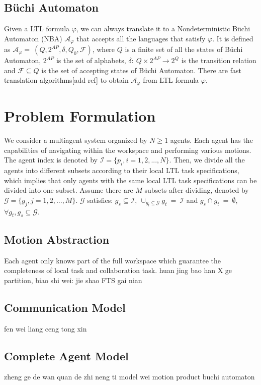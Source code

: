\documentclass[journal]{IEEEtran}
\begin{document}
\subsection{B\"{u}chi Automaton}
Given a LTL formula $\varphi$, we can always translate it to a Nondeterministic B\"{u}chi Automaton (NBA) $\mathcal{A}_\varphi$ that accepts all the languages that satisfy $\varphi$. It is defined as $\mathcal{A}_\varphi=\ (Q,2^{AP},\delta,Q_0,\mathcal{F})$, where $Q$ is a finite set of all the states of B\"{u}chi Automaton, $2^{AP}$ is the set of alphabets, $\delta:\ Q\times 2^{AP}\rightarrow 2^Q$ is the transition relation and $\mathcal{F}\subseteq Q$ is the set of accepting states of B\"{u}chi Automaton. There are fast translation algorithms[add ref] to obtain $\mathcal{A}_\varphi$ from LTL formula $\varphi$.

\section{Problem Formulation}
We consider a multiagent system organized by $N\geq1$ agents. Each agent has the capabilities of navigating within the workspace and performing various motions. The agent index is denoted by $\mathcal{I}=\{p_i,i=1,2,...,N\}$. Then, we divide all the agents into different subsets according to their local LTL task specifications, which implies that only agents with the same local LTL task specifications can be divided into one subset. Assume there are $M$ subsets after dividing, denoted by $\mathcal{G}=\{g_j,j=1,2,...,M\}$. $\mathcal{G}$ satisfies: $g_s\subseteq \mathcal{I},\ \cup_{g_t\subseteq \mathcal{G}}g_t\ =\ \mathcal{I}$ and $g_s\cap g_t\ =\ \emptyset$, $\forall g_t,g_s \subseteq \mathcal{G}$.
\subsection{Motion Abstraction}
Each agent only knows part of the full workspace which guarantee the completeness of local task and collaboration task. huan jing bao han X ge partition, biao shi wei:   jie shao FTS gai nian
\subsection{Communication Model}
fen wei liang ceng tong xin
\subsection{Complete Agent Model}
zheng ge de wan quan de zhi neng ti model wei motion product buchi automaton
\end{document}
